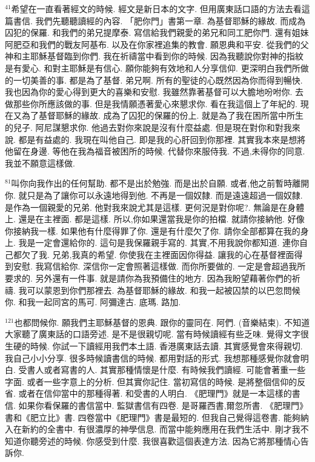 \documentclass{book}
\begin{document}
$^{41}$希望在一直看著經文的時候.
經文是新日本的文字.
但用廣東話口語的方法去看這篇書信.
我們先聽聽讀經的內容.
「肥你門」書第一章.
為基督耶穌的緣故.
而成為囚犯的保羅.
和我們的弟兄提摩泰.
寫信給我們親愛的弟兄和同工肥你門.
還有姐妹阿肥亞和我們的戰友阿基布.
以及在你家裡追集的教會.
願恩典和平安.
從我們的父神和主耶穌基督臨到你們.
我在祈禱當中看到你的時候.
因為我聽說你對神的指紋是有愛心.
和對主耶穌是有信心.
願你能夠有效地和人分享信仰.
更深明白我們所做的一切美善的事.
都是為了基督.
弟兄啊.
所有的聖徒的心既然因為你而得到暢快.
我也因為你的愛心得到更大的喜樂和安慰.
我雖然靠著基督可以大膽地吩咐你.
去做那些你所應該做的事.
但是我情願憑著愛心來懇求你.
看在我這個上了年紀的.
現在又為了基督耶穌的緣故.
成為了囚犯的保羅的份上.
就是為了我在困所當中所生的兒子.
阿尼謀懇求你.
他過去對你來說是沒有什麼益處.
但是現在對你和對我來說.
都是有益處的.
我現在叫他自己.
即是我的心肝回到你那裡.
其實我本來是想將他留在身邊.
等他在我為福音被困所的時候.
代替你來服侍我.
不過,未得你的同意.
我並不願意這樣做.

$^{81}$叫你向我作出的任何幫助.
都不是出於勉強.
而是出於自願.
或者,他之前暫時離開你.
就只是為了讓你可以永遠地得到他.
不再是一個奴隸.
而是遠遠超過一個奴隸.
是作為一個親愛的兄弟.
他對我來說尤其是這樣.
更何況是對你呢?.
無論是在身體上.
還是在主裡面.
都是這樣.
所以,你如果還當我是你的拍檔.
就請你接納他.
好像你接納我一樣.
如果他有什麼得罪了你.
還是有什麼欠了你.
請你全部都算在我的身上.
我是一定會還給你的.
這句是我保羅親手寫的.
其實,不用我說你都知道.
連你自己都欠了我.
兄弟,我真的希望.
你使我在主裡面因你得益.
讓我的心在基督裡面得到安慰.
我寫信給你.
深信你一定會照著這樣做.
而你所要做的.
一定是會超過我所要求的.
另外還有一件事.
就是請你為我預備住的地方.
因為我盼望藉著你們的祈禱.
我可以蒙恩到你們那裡去.
為基督耶穌的緣故.
和我一起被囚禁的以巴忽問候你.
和我一起同宮的馬可.
阿彌達古.
底瑪.
路加.

$^{121}$也都問候你.
願我們主耶穌基督的恩典.
跟你的靈同在.
阿們.
(音樂結束).
不知道大家聽了廣東話的口語旁述.
是不是很親切呢.
當有時候讀經有些乏味.
覺得文字很生硬的時候.
你試一下讀經用我們本土語.
香港廣東話去讀.
其實感覺會來得親切.
我自己小小分享.
很多時候讀書信的時候.
都用對話的形式.
我想那種感覺你就會明白.
受書人或者寫書的人.
其實那種情懷是什麼.
有時候我們讀經.
可能會著重一些字面.
或者一些字意上的分析.
但其實你記住.
當初寫信的時候.
是將整個信仰的反省.
或者在信仰當中的那種得著.
和受書的人明白.
《肥理門》就是一本這樣的書信.
如果你看保羅的書信當中.
監獄書信有四卷.
是哥羅西書,爾忽所書.
《肥理門》書和《肥立比》書.
四卷當中《肥理門》書是最短的.
但我自己覺得這卷書.
能夠納入在新約的全書中.
有很濃厚的神學信息.
而當中能夠應用在我們生活中.
剛才我不知道你聽旁述的時候.
你感受到什麼.
我很喜歡這個表達方法.
因為它將那種情心告訴你.
\end{document}

